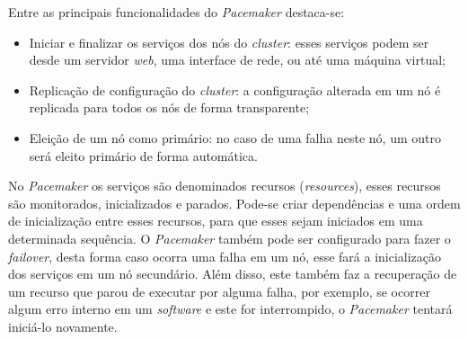 Entre as principais funcionalidades do \textit{Pacemaker} destaca-se:
\begin{itemize}
 \item Iniciar e finalizar os serviços dos nós do \textit{cluster}: esses serviços podem ser desde um servidor \textit{web}, uma interface de 
 rede, ou até uma máquina virtual;
 \item Replicação de configuração do \textit{cluster}: a configuração alterada em um nó é replicada para todos os nós de forma transparente;
 \item Eleição de um nó como primário: no caso de uma falha neste nó, um outro será eleito primário de forma automática.
\end{itemize}

No \textit{Pacemaker} os serviços são denominados recursos (\textit{resources}), esses recursos são monitorados, inicializados e parados.
Pode-se criar dependências e uma ordem de inicialização entre esses recursos, para que esses sejam iniciados em uma determinada sequência. O \textit{Pacemaker} 
também pode ser configurado para fazer o \textit{failover}, desta forma caso ocorra uma falha em um nó, esse fará a inicialização dos serviços 
em um nó secundário. Além disso, este também faz a recuperação de um recurso que parou de executar por alguma falha, por exemplo, 
se ocorrer algum erro interno em um \textit{software} e este for interrompido, o \textit{Pacemaker} tentará iniciá-lo novamente.

